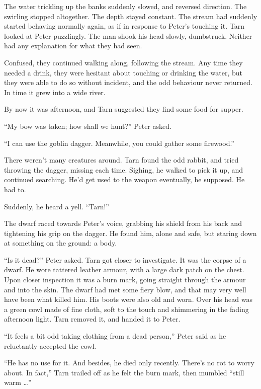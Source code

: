 The water trickling up the banks suddenly slowed, and reversed direction.  The swirling stopped altogether.  The depth stayed constant.  The stream had suddenly started behaving normally again, as if in response to Peter's touching it.  Tarn looked at Peter puzzlingly.  The man shook his head slowly, dumbstruck.  Neither had any explanation for what they had seen.

Confused, they continued walking along, following the stream.  Any time they needed a drink, they were hesitant about touching or drinking the water, but they were able to do so without incident, and the odd behaviour never returned.  In time it grew into a wide river.

By now it was afternoon, and Tarn suggested they find some food for supper.

``My bow was taken; how shall we hunt?'' Peter asked.

``I can use the goblin dagger.  Meanwhile, you could gather some firewood.''

There weren't many creatures around.  Tarn found the odd rabbit, and tried throwing the dagger, missing each time.  Sighing, he walked to pick it up, and continued searching.  He'd get used to the weapon eventually, he supposed.  He had to.

Suddenly, he heard a yell.  ``Tarn!''

The dwarf raced towards Peter's voice, grabbing his shield from his back and tightening his grip on the dagger.  He found him, alone and safe, but staring down at something on the ground: a body.

``Is it dead?'' Peter asked.  Tarn got closer to investigate. It was the corpse of a dwarf.  
He wore tattered leather armour, with a large dark patch on the chest.  Upon closer inspection it was a burn mark, going straight through the armour and into the skin.  The dwarf had met some fiery blow, and that may very well have been what killed him.  His boots were also old and worn.  Over his head was a green cowl made of fine cloth, soft to the touch and shimmering in the fading afternoon light.  Tarn removed it, and handed it to Peter.

``It feels a bit odd taking clothing from a dead person,'' Peter said as he reluctantly accepted the cowl.

``He has no use for it.  And besides, he died only recently.  There's no rot to worry about.  In fact,'' Tarn trailed off as he felt the burn mark, then mumbled ``still warm  \ldots''

